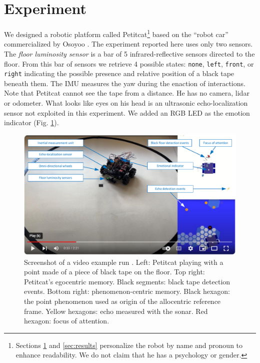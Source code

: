 \documentclass[runningheads]{llncs}
\begin{document}
\section{Experiment}
\label{sec:expe}

We designed a robotic platform called Petitcat\footnote{Sections \ref{sec:expe} and \ref{sec:results} personalize the robot by name and pronoun to enhance readability. We do not claim that he has a psychology or gender.} based on the ``robot car'' commercialized by Osoyoo \cite{osoyoo_robot_car}.
The experiment reported here uses only two sensors.
The \textit{floor luminosity sensor} is a bar of 5 infrared-reflective sensors directed to the floor.
From this bar of sensors we retrieve 4 possible states:  \texttt{none},  \texttt{left},  \texttt{front}, or \texttt{right} indicating the possible presence and relative position of a black tape beneath them.  
The IMU measures the yaw during the enaction of interactions.
Note that Petitcat cannot see the tape from a distance. 
He has no camera, lidar or odometer.
What looks like eyes on his head is an ultrasonic echo-localization sensor not exploited in this experiment. 
We added an RGB LED as the emotion indicator (Fig. \ref{fig:video}). 

\begin{figure}
	\includegraphics[width=\textwidth]{Figure_video.pdf}
	\caption{Screenshot of a video example run \cite{georgeon_petitcat_2024}.
		Left: Petitcat playing with a point made of a piece of black tape on the floor.
		Top right: Petitcat's egocentric memory. Black segments: black tape detection events. 
		Bottom right: phenomenon-centric memory. 
		Black hexagon: the point phenomenon used as origin of the allocentric reference frame. 
		Yellow hexagons: echo measured with the sonar. Red hexagon: focus of attention.} \label{fig:video}
\end{figure}
\end{document}
